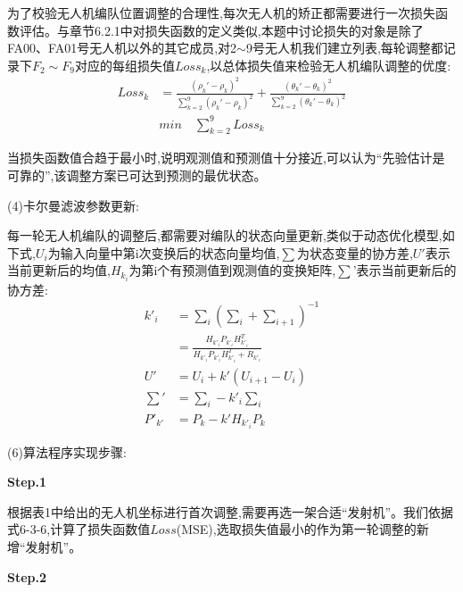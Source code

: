 \documentclass[withoutpreface,bwprint]{cumcmthesis}
\begin{document}
	为了校验无人机编队位置调整的合理性,每次无人机的矫正都需要进行一次损失函数评估。与章节6.2.1中对损失函数的定义类似,本题中讨论损失的对象是除了FA00、FA01号无人机以外的其它成员,对2$\sim$9号无人机我们建立列表,每轮调整都记录下$F_{2} \sim F_{9}$对应的每组损失值$Loss_{k}$,以总体损失值来检验无人机编队调整的优度:
	\begin{equation}
		\tag{6-3-6}
		\begin{split}
			Loss_{k} & = \frac{(\rho_{k}' - \rho_{k})^{2}}{\sum_{k=2}^{9}(\rho_{k}' - \rho_{k})^{2}} + \frac{(\theta_{k}' - \theta_{k})^{2}}{\sum_{k=2}^{9}(\theta_{k}' - \theta_{k})^{2}}  \\
			&min\quad\sum_{k=2}^{9}Loss_{k}
		\end{split}
	\end{equation}	
	
	当损失函数值合趋于最小时,说明观测值和预测值十分接近,可以认为“先验估计是可靠的”,该调整方案已可达到预测的最优状态。
	
	(4)卡尔曼滤波参数更新:
	
	每一轮无人机编队的调整后,都需要对编队的状态向量更新,类似于动态优化模型,如下式,$U_{i}$为输入向量中第i次变换后的状态向量均值,$\sum$为状态变量的协方差,$U'$表示当前更新后的均值,$H_{k_{i}}$为第i个有预测值到观测值的变换矩阵,$\sum$'表示当前更新后的协方差:
	\begin{equation}
		\tag{6-3-7}
		\begin{split}
			k'_{i}&= \sum_{i}( \sum_{i}+ \sum_{i+1})^{-1}\\
			&= \frac{H_{k'_{i}}P_{k'_{i}}H_{k'_{i}}^{T}}{H_{k'_{i}}P_{k'_{i}}H_{k'_{i}}^{T}+R_{k'_{i}}} \\
			U'&= U_{i}+ k'(U_{i+1}- U_{i}) \\
			\sum'& = \sum_{i} - k'_{i}\sum_{i} \\
			P'_{k'}& =P_{k}-k'H_{k'_{i}}P_{k}
		\end{split}
	\end{equation}
	
	
	
	(6)算法程序实现步骤:
	
	\noindent\textbf{Step.1}
	
	根据表1中给出的无人机坐标进行首次调整,需要再选一架合适“发射机”。我们依据式6-3-6,计算了损失函数值$Loss$(MSE),选取损失值最小的作为第一轮调整的新增“发射机”。
	
	\noindent	\textbf{Step.2}
	
\end{document}
